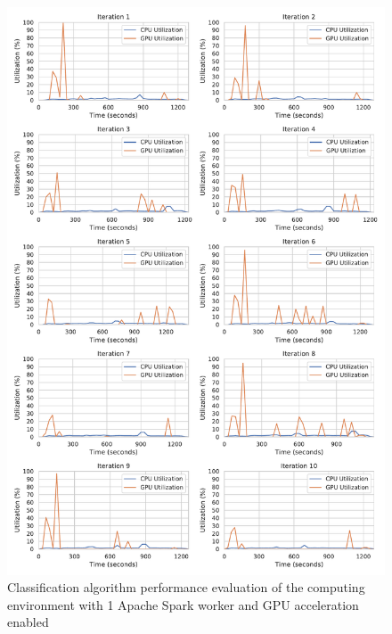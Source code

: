 \begin{figure}[h]
\centering
\includegraphics[scale=0.53]{images/07_evaluation/mortgage/mortgage_gpu1_performance}
\caption{Classification algorithm performance evaluation of the computing environment with 1 Apache Spark worker and GPU acceleration enabled}
\label{fig:07_mortgage_static-cpu_results}
\end{figure}

